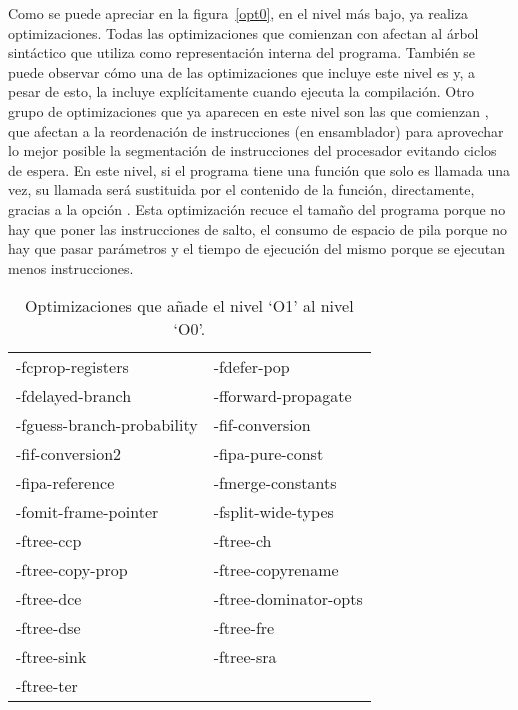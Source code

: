 Como se puede apreciar en la figura~\ref{opt0}, en el nivel más bajo,  ya realiza optimizaciones. Todas las optimizaciones que comienzan con  afectan al árbol sintáctico que utiliza  como representación interna del programa. También se puede observar cómo una de las optimizaciones que incluye este nivel es  y, a pesar de esto,  la incluye explícitamente cuando ejecuta la compilación. Otro grupo de optimizaciones que ya aparecen en este nivel son las que comienzan , que afectan a la reordenación de instrucciones (en ensamblador) para aprovechar lo mejor posible la segmentación de instrucciones del procesador evitando ciclos de espera. En este nivel, si el programa tiene una función que solo es llamada una vez, su llamada será sustituida por el contenido de la función, directamente, gracias a la opción . Esta optimización recuce el tamaño del programa porque no hay que poner las instrucciones de salto, el consumo de espacio de pila porque no hay que pasar parámetros y el tiempo de ejecución del mismo porque se ejecutan menos instrucciones.

\begin{table}[htb]
\begin{center}
	\begin{tabular}{ll}
		-fcprop-registers & -fdefer-pop\\
		-fdelayed-branch & -fforward-propagate\\
		-fguess-branch-probability &-fif-conversion\\
		-fif-conversion2 & -fipa-pure-const\\
		-fipa-reference & -fmerge-constants\\
		-fomit-frame-pointer & -fsplit-wide-types\\
		-ftree-ccp & -ftree-ch\\
		-ftree-copy-prop & -ftree-copyrename\\
		-ftree-dce & -ftree-dominator-opts\\
		-ftree-dse & -ftree-fre\\
		-ftree-sink & -ftree-sra\\
		-ftree-ter & \\
	\end{tabular}
\end{center}
\caption{Optimizaciones que añade el nivel `O1' al nivel `O0'.}
\label{opt1}
\end{table}

